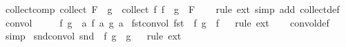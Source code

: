 \begin{isabellebody}
\isanewline
{}\isamarkupfalse%
\ collect{\isacharunderscore}{\kern0pt}comp{\isacharcolon}{\kern0pt}\ {\isachardoublequoteopen}collect\ F\ {\isasymcirc}\ g\ {\isacharequal}{\kern0pt}\ collect\ {\isacharparenleft}{\kern0pt}{\isacharparenleft}{\kern0pt}{\isasymlambda}f{\isachardot}{\kern0pt}\ f\ {\isasymcirc}\ g{\isacharparenright}{\kern0pt}\ {\isacharbackquote}{\kern0pt}\ F{\isacharparenright}{\kern0pt}{\isachardoublequoteclose}\isanewline
%
\isadelimproof
\ \ %
\endisadelimproof
%
\isatagproof
{}\isamarkupfalse%
\ {\isacharparenleft}{\kern0pt}rule\ ext{\isacharparenright}{\kern0pt}\ {\isacharparenleft}{\kern0pt}simp\ add{\isacharcolon}{\kern0pt}\ collect{\isacharunderscore}{\kern0pt}def{\isacharparenright}{\kern0pt}%
\endisatagproof
{\isafoldproof}%
%
\isadelimproof
\isanewline
%
\endisadelimproof
\isanewline
{}\isamarkupfalse%
\ convol\ {\isacharparenleft}{\kern0pt}{\isachardoublequoteopen}{\isasymlangle}{\isacharparenleft}{\kern0pt}{\isacharunderscore}{\kern0pt}{\isacharcomma}{\kern0pt}{\isacharslash}{\kern0pt}\ {\isacharunderscore}{\kern0pt}{\isacharparenright}{\kern0pt}{\isasymrangle}{\isachardoublequoteclose}{\isacharparenright}{\kern0pt}\ \isanewline
\ \ {\isachardoublequoteopen}{\isasymlangle}f{\isacharcomma}{\kern0pt}\ g{\isasymrangle}\ {\isasymequiv}\ {\isasymlambda}a{\isachardot}{\kern0pt}\ {\isacharparenleft}{\kern0pt}f\ a{\isacharcomma}{\kern0pt}\ g\ a{\isacharparenright}{\kern0pt}{\isachardoublequoteclose}\isanewline
\isanewline
{}\isamarkupfalse%
\ fst{\isacharunderscore}{\kern0pt}convol{\isacharcolon}{\kern0pt}\ {\isachardoublequoteopen}fst\ {\isasymcirc}\ {\isasymlangle}f{\isacharcomma}{\kern0pt}\ g{\isasymrangle}\ {\isacharequal}{\kern0pt}\ f{\isachardoublequoteclose}\isanewline
%
\isadelimproof
\ \ %
\endisadelimproof
%
\isatagproof
{}\isamarkupfalse%
{\isacharparenleft}{\kern0pt}rule\ ext{\isacharparenright}{\kern0pt}\isanewline
\ \ \isamarkupfalse%
\ convol{\isacharunderscore}{\kern0pt}def\ \isamarkupfalse%
\ simp%
\endisatagproof
{\isafoldproof}%
%
\isadelimproof
\isanewline
%
\endisadelimproof
\isanewline
{}\isamarkupfalse%
\ snd{\isacharunderscore}{\kern0pt}convol{\isacharcolon}{\kern0pt}\ {\isachardoublequoteopen}snd\ {\isasymcirc}\ {\isasymlangle}f{\isacharcomma}{\kern0pt}\ g{\isasymrangle}\ {\isacharequal}{\kern0pt}\ g{\isachardoublequoteclose}\isanewline
%
\isadelimproof
\ \ %
\endisadelimproof
%
\isatagproof
{}\isamarkupfalse%
{\isacharparenleft}{\kern0pt}rule\ ext{\isacharparenright}{\kern0pt}\isanewline

\end{isabellebody}
